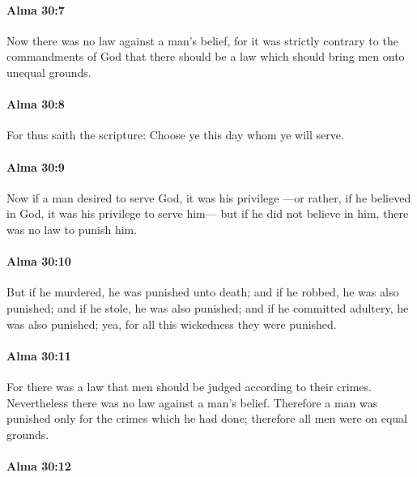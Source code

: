 		\paragraph{Alma 30:7} %
			\label{ALMA-30-7}

			Now there was no law against a man's belief,
			for it was strictly contrary to the commandments of God
			that there should be a law which should bring men onto unequal grounds.

		\paragraph{Alma 30:8} %
			\label{ALMA-30-8}

			For thus saith the scripture:
			Choose ye this day whom ye will serve.

		\paragraph{Alma 30:9} %
			\label{ALMA-30-9}

			Now if a man desired to serve God, it was his privilege
			---or rather, if he believed in God, it was his privilege to serve him---
			but if he did not believe in him, there was no law to punish him.

		\paragraph{Alma 30:10} %
			\label{ALMA-30-10}

			But if he murdered, he was punished unto death;
			and if he robbed, he was also punished;
			and if he stole, he was also punished;
			and if he committed adultery, he was also punished;
			yea, for all this wickedness they were punished.

		\paragraph{Alma 30:11} %
			\label{ALMA-30-11}

			For there was a law that men should be judged according to their crimes.
			Nevertheless there was no law against a man's belief.
			Therefore a man was punished only for the crimes which he had done;
			therefore all men were on equal grounds.

		\paragraph{Alma 30:12} %
			\label{ALMA-30-12}


